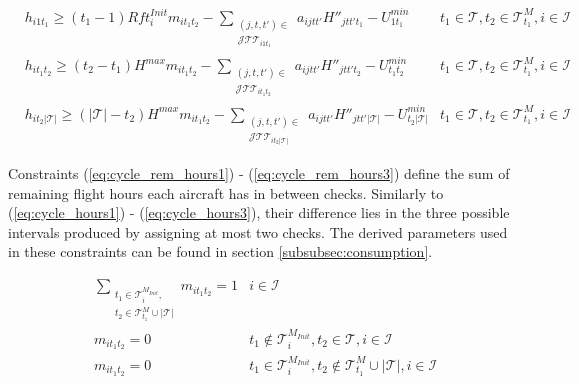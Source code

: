 \documentclass[a4paper,onecolumn,fleqn]{article}
\begin{document}
    \begin{align}
        & h_{i1t_1} \geq (t_1 - 1) Rft^{Init}_i m_{it_1t_2} - \sum_{\substack{(j, t, t') \in \\ \mathcal{J}\mathcal{T}\mathcal{T}_{i1t_1}}} a_{ijtt'} H''_{jtt't_1} - U^{min}_{1t_1} 
            & t_1 \in \mathcal{T}, t_2 \in \mathcal{T}^M_{t_1}, i \in \mathcal{I}\label{eq:cycle_rem_hours1}\\
        & h_{it_1t_2} \geq (t_2 - t_1) H^{max} m_{it_1t_2} - \sum_{\substack{(j, t, t') \in \\ \mathcal{J}\mathcal{T}\mathcal{T}_{it_1t_2}}} a_{ijtt'} H''_{jtt't_2} - U^{min}_{t_1t_2}
            &t_1 \in \mathcal{T}, t_2 \in \mathcal{T}^M_{t_1}, i \in \mathcal{I}\label{eq:cycle_rem_hours2}\\
        & h_{it_2|\mathcal{T}|} \geq (|\mathcal{T}|- t_2) H^{max} m_{it_1t_2} - \sum_{\substack{(j, t, t') \in \\ \mathcal{J}\mathcal{T}\mathcal{T}_{it_2|\mathcal{T}|}}} a_{ijtt'} H''_{jtt'|\mathcal{T}|} - U^{min}_{t_2|\mathcal{T}|}
            & t_1 \in \mathcal{T}, t_2 \in \mathcal{T}^M_{t_1}, i \in \mathcal{I}\label{eq:cycle_rem_hours3}
    \end{align} 

    Constraints (\ref{eq:cycle_rem_hours1}) - (\ref{eq:cycle_rem_hours3}) define the sum of remaining flight hours each aircraft has in between checks. Similarly to (\ref{eq:cycle_hours1}) - (\ref{eq:cycle_hours3}), their difference lies in the three possible intervals produced by assigning at most two checks. The derived parameters used in these constraints can be found in section \ref{subsubsec:consumption}.

    \begin{align}
        & \sum_{\substack{t_1 \in \mathcal{T}^{M_{Init}}_i, \\ t_2 \in \mathcal{T}^M_{t_1} \cup |\mathcal{T}|}} m_{it_1t_2} =  1 
          & i \in \mathcal{I}\label{eq:num_maint} \\
        & m_{it_1t_2} =  0
          & t_1 \notin \mathcal{T}^{M_{Init}}_i, t_2 \in \mathcal{T}, i \in \mathcal{I} \label{eq:maint_forbid} \\
        & m_{it_1t_2} =  0
          & t_1 \in \mathcal{T}^{M_{Init}}_i, t_2 \notin \mathcal{T}^M_{t_1} \cup |\mathcal{T}|, i \in \mathcal{I} \label{eq:maint_forbid2}
    \end{align}
\end{document}
